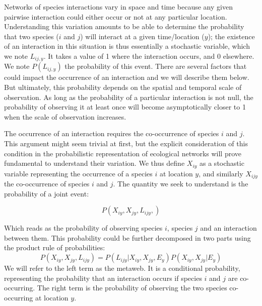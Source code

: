 \documentclass[12pt]{article}
\begin{document}
Networks of species interactions vary in space and time because any given
pairwise interaction could either occur or not at any particular location.
Understanding this variation amounts to be able to determine the probability
that two species ($i$ and $j$) will interact at a given time/location ($y$);
the existence of an interaction in this situation is thus essentially a
stochastic variable, which we note $L_{ij,y}$. It takes a value of 1 where the
interaction occurs, and 0 elsewhere. We note $P(L_{ij,y})$ the probability
of this event. There are several factors that could impact the occurrence
of an interaction and we will describe them below. But ultimately, this
probability depends on the spatial and temporal scale of observation. As long
as the probability of a particular interaction is not null, the probability
of observing it at least once will become asymptotically closer to 1 when
the scale of observation increases.

The occurrence of an interaction requires the co-occurrence of species $i$ and
$j$. This argument might seem trivial at first, but the explicit consideration
of this condition in the probabilistic representation of ecological networks
will prove fundamental to understand their variation.
We thus define $X_{iy}$
as a stochastic variable representing the occurrence of a species $i$ at
location $y$, and similarly $X_{ijy}$ the co-occurrence of species $i$ and
$j$. The quantity we seek to understand is the probability of a joint event:

\begin{equation}
	P(X_{iy},X_{jy},L_{ijy},)
\end{equation}

Which reads as the probability of observing species $i$, species $j$ and an
interaction between them. This probability could be further decomposed in two parts using the
product rule of probabilities:
\begin{equation}
	P(X_{iy},X_{jy},L_{ijy})=P(L_{ijy}|X_{iy},X_{jy},E_y)P(X_{iy},X_{jy}|E_y)
\end{equation}
We will refer to the left term as the metaweb. It is a conditional probability,
representing the probability that an interaction occurs if species $i$ and $j$
are co-occurring. The right term is the probability of observing the two species
co-occurring at location $y$.
\end{document}
